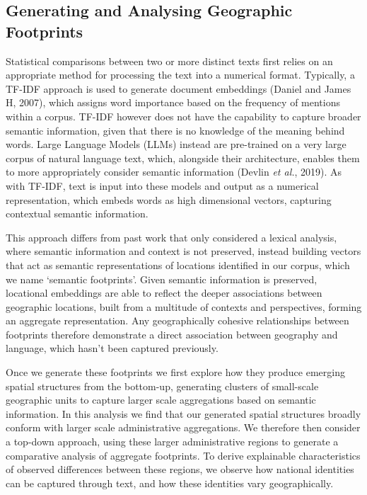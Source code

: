 \documentclass[
  letterpaper,
  11pt,
  english,
  onehalfspacing,
  headsepline]{MastersDoctoralThesis}
\begin{document}
\hypertarget{generating-and-analysing-geographic-footprints}{%
\subsection{Generating and Analysing Geographic
Footprints}\label{generating-and-analysing-geographic-footprints}}

Statistical comparisons between two or more distinct texts first relies
on an appropriate method for processing the text into a numerical
format. Typically, a TF-IDF approach is used to generate document
embeddings (Daniel and James H, 2007), which assigns word importance
based on the frequency of mentions within a corpus. TF-IDF however does
not have the capability to capture broader semantic information, given
that there is no knowledge of the meaning behind words. Large Language
Models (LLMs) instead are pre-trained on a very large corpus of natural
language text, which, alongside their architecture, enables them to more
appropriately consider semantic information (Devlin \emph{et al.},
2019). As with TF-IDF, text is input into these models and output as a
numerical representation, which embeds words as high dimensional
vectors, capturing contextual semantic information.

This approach differs from past work that only considered a lexical
analysis, where semantic information and context is not preserved,
instead building vectors that act as semantic representations of
locations identified in our corpus, which we name `semantic footprints'.
Given semantic information is preserved, locational embeddings are able
to reflect the deeper associations between geographic locations, built
from a multitude of contexts and perspectives, forming an aggregate
representation. Any geographically cohesive relationships between
footprints therefore demonstrate a direct association between geography
and language, which hasn't been captured previously.

Once we generate these footprints we first explore how they produce
emerging spatial structures from the bottom-up, generating clusters of
small-scale geographic units to capture larger scale aggregations based
on semantic information. In this analysis we find that our generated
spatial structures broadly conform with larger scale administrative
aggregations. We therefore then consider a top-down approach, using
these larger administrative regions to generate a comparative analysis
of aggregate footprints. To derive explainable characteristics of
observed differences between these regions, we observe how national
identities can be captured through text, and how these identities vary
geographically.
\end{document}
